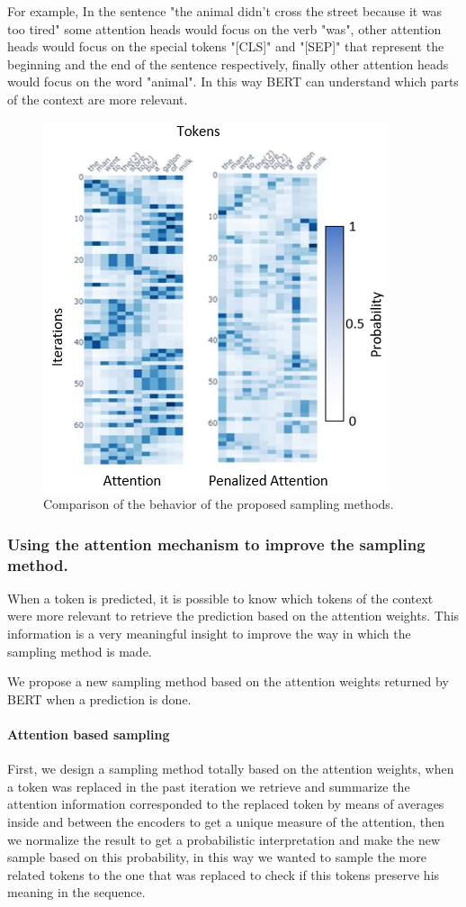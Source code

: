 \documentclass[10pt,twocolumn,letterpaper]{article}
\begin{document}
For example, In the sentence "the animal didn't cross the street because it was too tired"
some attention heads would focus on the verb "was", other attention heads would focus
on the special tokens "[CLS]" and "[SEP]" that represent the beginning and the end of the sentence
respectively, finally other attention heads would focus on the word "animal". In this way BERT can
understand which parts of the context are more relevant.

\begin{figure}
   \centering
   \includegraphics[scale=0.7]{attComp.PNG}
   \caption{Comparison of the behavior of the proposed sampling methods.}
   \label{fig:AttentComp}
\end{figure}

\subsubsection{Using the attention mechanism to improve the sampling method.}
When a token is predicted, it is possible to know which tokens of the context were more relevant to
retrieve the prediction based on the attention weights.
This information is a very meaningful insight to improve
the way in which the sampling method is made.

We propose a new sampling method based on the attention
weights returned by BERT when a prediction is done.

\paragraph{Attention based sampling}
First, we design a sampling method totally based on the attention weights,
when a token was replaced in the past iteration we retrieve and summarize the
attention information corresponded to the replaced token by means of averages
inside and between the encoders to get a unique measure of the attention, then
we normalize the result to get a probabilistic interpretation and make the new
sample based on this probability, in this way we wanted to sample the more related
tokens to the one that was replaced to check if this tokens preserve his meaning in the sequence.
\end{document}
